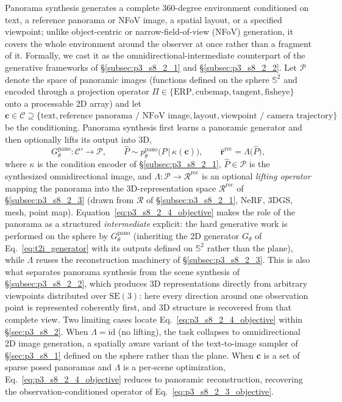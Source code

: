 Panorama synthesis generates a complete 360-degree environment conditioned on text, a reference panorama or NFoV image, a spatial layout, or a specified viewpoint; unlike object-centric or narrow-field-of-view (NFoV) generation, it covers the whole environment around the observer at once rather than a fragment of it.
Formally, we cast it as the omnidirectional-intermediate counterpart of the generative frameworks of §\ref{subsec:p3_s8_2_1} and §\ref{subsec:p3_s8_2_2}.
Let $\mathcal{P}$ denote the space of panoramic images (functions defined on the sphere $\mathbb{S}^2$ and encoded through a projection operator $\Pi\in\{\text{ERP},\text{cubemap},\text{tangent},\text{fisheye}\}$ onto a processable 2D array) and let $\mathbf{c}\in\mathcal{C}\supseteq\{\text{text},\text{reference panorama / NFoV image},\text{layout},\text{viewpoint / camera trajectory}\}$ be the conditioning.
Panorama synthesis first learns a panoramic generator and then optionally lifts its output into 3D,
\begin{equation}
G_\theta^{\text{pano}}:\mathcal{C}'\rightarrow\mathcal{P},
\qquad
\hat{P}\sim p_\theta^{\text{pano}}\!\big(P\,\big|\,\kappa(\mathbf{c})\big),
\qquad
\hat{\mathbf{r}}^{\text{rec}} = \Lambda\big(\hat{P}\big),
\label{eq:p3_s8_2_4_objective}
\end{equation}
where $\kappa$ is the condition encoder of §\ref{subsec:p3_s8_2_1}, $\hat{P}\in\mathcal{P}$ is the synthesized omnidirectional image, and $\Lambda:\mathcal{P}\rightarrow\mathcal{R}^{\text{rec}}$ is an optional \emph{lifting operator} mapping the panorama into the 3D-representation space $\mathcal{R}^{\text{rec}}$ of §\ref{subsec:p3_s8_2_3} (drawn from $\mathcal{R}$ of §\ref{subsec:p3_s8_2_1}, \eg NeRF, 3DGS, mesh, point map).
Equation~\eqref{eq:p3_s8_2_4_objective} makes the role of the panorama as a structured \emph{intermediate} explicit: the hard generative work is performed on the sphere by $G_\theta^{\text{pano}}$ (inheriting the 2D generator $G_\theta$ of Eq.~\eqref{eq:t2i_generator} with its outputs defined on $\mathbb{S}^2$ rather than the plane), while $\Lambda$ reuses the reconstruction machinery of §\ref{subsec:p3_s8_2_3}.
This is also what separates panorama synthesis from the scene synthesis of §\ref{subsec:p3_s8_2_2}, which produces 3D representations directly from arbitrary viewpoints distributed over $\mathrm{SE}(3)$: here every direction around one observation point is represented coherently first, and 3D structure is recovered from that complete view.
Two limiting cases locate Eq.~\eqref{eq:p3_s8_2_4_objective} within §\ref{sec:p3_s8_2}.
When $\Lambda=\mathrm{id}$ (no lifting), the task collapses to omnidirectional 2D image generation, a spatially aware variant of the text-to-image sampler of §\ref{sec:p3_s8_1} defined on the sphere rather than the plane.
When $\mathbf{c}$ is a set of sparse posed panoramas and $\Lambda$ is a per-scene optimization, Eq.~\eqref{eq:p3_s8_2_4_objective} reduces to panoramic reconstruction, recovering the observation-conditioned operator of Eq.~\eqref{eq:p3_s8_2_3_objective}.

